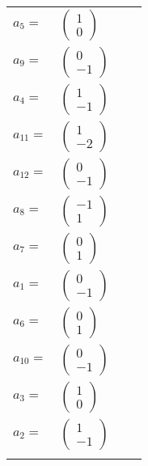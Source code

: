 \documentclass[1p]{elsarticle_modified}
\theoremstyle{definition}
\begin{document}
\begin{tabular}{m{7pt} m{180pt} m{7pt} m{180pt} }
\flushright $a_{5}=$&$\begin{pmatrix}1\\0\end{pmatrix}$ \\
\flushright $a_{9}=$&$\begin{pmatrix}0\\-1\end{pmatrix}$ \\
\flushright $a_{4}=$&$\begin{pmatrix}1\\-1\end{pmatrix}$ \\
\flushright $a_{11}=$&$\begin{pmatrix}1\\-2\end{pmatrix}$ \\
\flushright $a_{12}=$&$\begin{pmatrix}0\\-1\end{pmatrix}$ \\
\flushright $a_{8}=$&$\begin{pmatrix}-1\\1\end{pmatrix}$ \\
\flushright $a_{7}=$&$\begin{pmatrix}0\\1\end{pmatrix}$ \\
\flushright $a_{1}=$&$\begin{pmatrix}0\\-1\end{pmatrix}$ \\
\flushright $a_{6}=$&$\begin{pmatrix}0\\1\end{pmatrix}$ \\
\flushright $a_{10}=$&$\begin{pmatrix}0\\-1\end{pmatrix}$ \\
\flushright $a_{3}=$&$\begin{pmatrix}1\\0\end{pmatrix}$ \\
\flushright $a_{2}=$&$\begin{pmatrix}1\\-1\end{pmatrix}$\\&\end{tabular}
\end{document}
